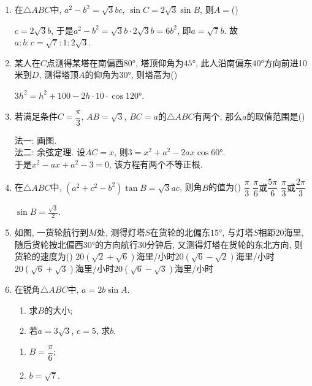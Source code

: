 \begin{enumerate}
\item 在$\triangle{ABC}$中, $a^2-b^2=\sqrt{3}bc$, $\sin{C}=2\sqrt{3}\sin{B}$, 则$A=$\dotfill()
\begin{jieda}
$c=2\sqrt{3}b$, 于是$a^2-b^2=\sqrt{3}b\cdot2\sqrt{3}b=6b^2$, 即$a=\sqrt{7}b$. 故$a:b:c=\sqrt{7}:1:2\sqrt{3}$. 
\end{jieda}

\item 某人在$C$点测得某塔在南偏西$\ang{80}$, 塔顶仰角为$\ang{45}$, 此人沿南偏东$\ang{40}$方向前进10米到$D$, 测得塔顶$A$的仰角为$\ang{30}$, 则塔高为\dotfill()
\begin{jieda}
$3h^2=h^2+100-2h\cdot10\cdot\cos\ang{120}$. 
\end{jieda}

\item 若满足条件$C=\dfrac{\pi}{3}$, $AB=\sqrt{3}$, $BC=a$的$\triangle{ABC}$有两个, 那么$a$的取值范围是\dotfill()
\begin{jieda}
法一: 画图. \\
法二: 余弦定理. 设$AC=x$, 则$3=x^2+a^2-2ax\cos\ang{60}$. \\
于是$x^2-ax+a^2-3=0$, 该方程有两个不等正根. 
\end{jieda}

\item 在$\triangle{ABC}$中, $(a^2+c^2-b^2)\tan{B}=\sqrt{3}ac$, 则角$B$的值为\dotfill()
{$\dfrac{\pi}{3}$}
{$\dfrac{\pi}{6}$或$\dfrac{5\pi}{6}$}
{$\dfrac{\pi}{3}$或$\dfrac{2\pi}{3}$}
\begin{jieda}
$\sin{B}=\frac{\sqrt{3}}{2}$. 
\end{jieda}

\item 如图, 一货轮航行到$M$处, 测得灯塔$S$在货轮的北偏东$\ang{15}$, 与灯塔$S$相距20海里, 随后货轮按北偏西$\ang{30}$的方向航行30分钟后, 
又测得灯塔在货轮的东北方向, 则货轮的速度为\dotfill()
\xx
{$20(\sqrt{2}+\sqrt{6})$海里/小时}{$20(\sqrt{6}-\sqrt{2})$海里/小时}
{$20(\sqrt{6}+\sqrt{3})$海里/小时}{$20(\sqrt{6}-\sqrt{3})$海里/小时}

\item 在锐角$\triangle{ABC}$中, $a=2b\sin{A}$.
\begin{enumerate}
\item 求$B$的大小; 
\item 若$a=3\sqrt{3}$, $c=5$, 求$b$. 
\end{enumerate}
\begin{jieda}
\begin{enumerate}
\item $B=\dfrac{\pi}{6}$; 
\item $b=\sqrt{7}$. 
\end{enumerate}
\end{jieda}


\end{enumerate}
